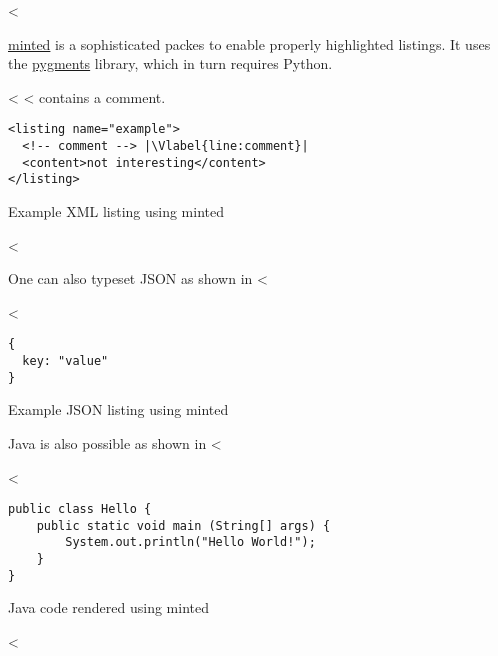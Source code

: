 <%

\href{https://github.com/gpoore/minted}{minted} is a sophisticated packes to enable properly highlighted listings.
It uses the \href{http://pygments.org/}{pygments} library, which in turn requires Python.

<%
<%
 contains a comment.

\begin{listing}[htbp]
    \begin{verbatim}
<listing name="example">
  <!-- comment --> |\Vlabel{line:comment}|
  <content>not interesting</content>
</listing>
\end{verbatim}
  \caption{Example XML listing using minted}
  \label{lst:XML}
\end{listing}
<%

One can also typeset JSON as shown in <%

<%
\begin{listing}[htbp]
    \begin{verbatim}
{
  key: "value"
}
\end{verbatim}
  \caption{Example JSON listing using minted}
  \label{lst:flJSON}
\end{listing}

Java is also possible as shown in <%

<%
\begin{listing}[htbp]
    \begin{verbatim}
public class Hello {
    public static void main (String[] args) {
        System.out.println("Hello World!");
    }
}
\end{verbatim}
  \caption{Java code rendered using minted}
  \label{lst:java}
\end{listing}
<%
